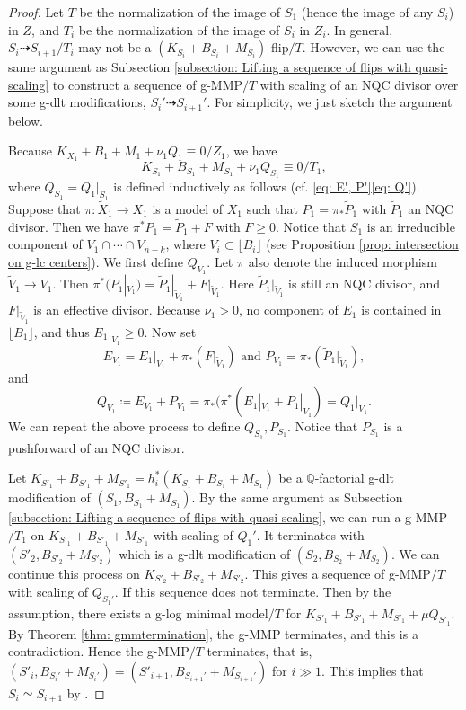 \documentclass[11pt]{amsart}
\newcommand{\Qq}{\mathbb{Q}}
\newcommand{\lf}{\lfloor}
\newcommand{\rf}{\rfloor}
\begin{document}
\begin{proof}
	
Let $T$ be the normalization of the image of $S_1$ (hence the image of any $S_i$) in $Z$, and $T_i$ be the normalization of the image of $S_i$ in $Z_i$. In general, $S_i\dashrightarrow S_{i+1}/T_i$ may not be a $(K_{S_i}+B_{S_i}+M_{S_i})$-flip$/T$. However, we can use the same argument as Subsection \ref{subsection: Lifting a sequence of flips with quasi-scaling} to construct a sequence of g-MMP$/T$ with scaling of an NQC divisor over some g-dlt modifications, $S_i' \dashrightarrow S_{i+1}'$. For simplicity, we just sketch the argument below.

Because $K_{X_1}+B_1+M_1+\nu_1 Q_1 \equiv 0/Z_1$, we have
\[
K_{S_1}+B_{S_1}+M_{S_1}+\nu_1 Q_{S_1} \equiv 0/T_1,
\] where $Q_{S_1} = Q_1|_{S_1}$ is defined inductively as follows (cf. \eqref{eq: E', P'}\eqref{eq: Q'}). Suppose that $\pi: \tilde X_1 \to X_1$ is a model of $X_1$ such that $P_1=\pi_*\tilde P_1$ with $\tilde P_1$ an NQC divisor. Then we have $\pi^*P_1 = \tilde P_1 +F$ with $F \geq 0$. Notice that $S_1$ is an irreducible component of $V_1 \cap \cdots \cap V_{n-k}$, where $V_i \subset \lf B_i \rf$ (see Proposition \ref{prop: intersection on g-lc centers}). We first define $Q_{V_1}$. Let $\pi$ also denote the induced morphism $\tilde V_1 \to V_1$. Then $\pi^*(P_1|_{V_1}) = \tilde P_1|_{\tilde V_1}+F|_{\tilde V_1}$. Here $\tilde P_1|_{\tilde  V_1}$ is still an NQC divisor, and $F|_{\tilde V_1}$ is an effective divisor. Because $\nu_1>0$, no component of $E_1$ is contained in $\lf B_1 \rf$, and thus $E_1|_{V_1} \geq 0$. Now set
\[
E_{V_1} = E_1|_{V_1} + \pi_*(F|_{\tilde V_1}) \text{~and~} P_{V_1} = \pi_*(\tilde P_1|_{\tilde V_1}),
\] and
\[
Q_{V_1} \coloneqq E_{V_1} + P_{V_1}= \pi_*(\pi^*(E_1|_{V_1}+P_1|_{V_1}) = Q_1|_{V_1}.\] We can repeat the above process to define $Q_{S_1}, P_{S_1}$. Notice that $P_{S_1}$ is a pushforward of an NQC divisor.

Let $K_{S'_1}+ B_{S'_1}+M_{S'_1} = h_i^*(K_{S_1}+ B_{S_1}+M_{S_1})$ be a $\Qq$-factorial g-dlt modification of $(S_1, B_{S_1}+M_{S_1})$. By the same argument as Subsection \ref{subsection: Lifting a sequence of flips with quasi-scaling}, we can run a g-MMP$/T_1$ on $K_{S'_1}+ B_{S'_1}+M_{S'_1}$ with scaling of $Q_1'$. It terminates with $(S'_2,  B_{S'_2}+M_{S'_2})$ which is a g-dlt modification of $(S_2,  B_{S_2}+M_{S_2})$. We can continue this process on $K_{S'_2}+B_{S'_2}+M_{S'_2}$. This gives a sequence of g-MMP$/T$ with scaling of $Q_{S_1'}$. If this sequence does not terminate. Then by the assumption, there exists a g-log minimal model$/T$ for $K_{S'_1}+B_{S'_1}+M_{S'_1}+\mu Q_{S'_1}$. By Theorem \ref{thm: gmmtermination}, the g-MMP terminates, and this is a contradiction. Hence the g-MMP$/T$ terminates, that is, $(S'_i, B_{S_i'}+M_{S_i'})= (S'_{i+1}, B_{S_{i+1}'}+M_{S_{i+1}'})$ for $i\gg 1$. This implies that $S_i \simeq S_{i+1}$ by \cite[Lemma 4.2.16]{Fujino07}.
\end{proof}
\end{document}
